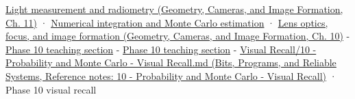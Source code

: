 \href{../03-Geometry-Cameras-and-Image-Formation/main.pdf\#nameddest=03-visual-computing-i-ch004-light-measurement-and-radiometry}{Light measurement and radiometry (Geometry, Cameras, and Image Formation, Ch. 11)} · \hyperref[03-visual-computing-i-ch012-numerical-integration-and-monte-carlo-estimation]{Numerical integration and Monte Carlo estimation} · \href{../03-Geometry-Cameras-and-Image-Formation/main.pdf\#nameddest=03-visual-computing-i-ch003-lens-optics-focus-and-image-formation}{Lens optics, focus, and image formation (Geometry, Cameras, and Image Formation, Ch. 10)} - \hyperref[02-foundations-ii-ch023-random-quantities-and-their-probability-laws]{Phase 10 teaching section} - \hyperref[02-foundations-ii-ch029-transformations-turn-simple-inputs-into-useful-samples]{Phase 10 teaching section} - \href{../01-Bits-Programs-and-Reliable-Systems/main.pdf\#nameddest=appendix-cb5af353ef77}{Visual Recall/10 - Probability and Monte Carlo - Visual Recall.md (Bits, Programs, and Reliable Systems, Reference notes: 10 - Probability and Monte Carlo - Visual Recall)} · Phase 10 visual recall
